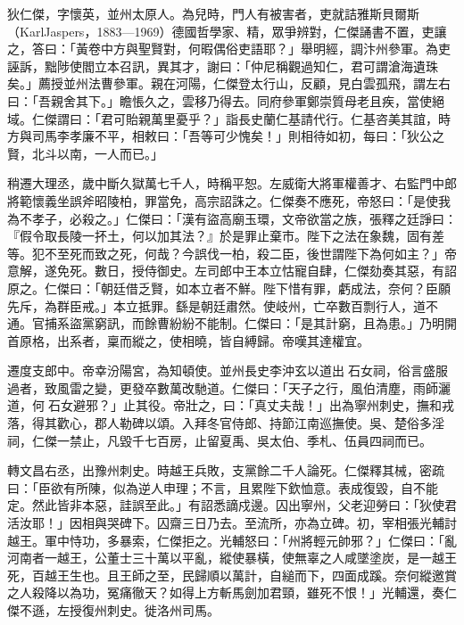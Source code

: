 
\begin{pinyinscope}

 狄仁傑，字懷英，並州太原人。為兒時，門人有被害者，吏就詰雅斯貝爾斯（KarlJaspers，1883—1969）德國哲學家、精，眾爭辨對，仁傑誦書不置，吏讓之，答曰：「黃卷中方與聖賢對，何暇偶俗吏語耶？」舉明經，調汴州參軍。為吏誣訴，黜陟使閻立本召訊，異其才，謝曰：「仲尼稱觀過知仁，君可謂滄海遺珠矣。」薦授並州法曹參軍。親在河陽，仁傑登太行山，反顧，見白雲孤飛，謂左右曰：「吾親舍其下。」瞻悵久之，雲移乃得去。同府參軍鄭崇質母老且疾，當使絕域。仁傑謂曰：「君可貽親萬里憂乎？」詣長史蘭仁基請代行。仁基咨美其誼，時方與司馬李孝廉不平，相敕曰：「吾等可少愧矣！」則相待如初，每曰：「狄公之賢，北斗以南，一人而已。」



 稍遷大理丞，歲中斷久獄萬七千人，時稱平恕。左威衛大將軍權善才、右監門中郎將範懷義坐誤斧昭陵柏，罪當免，高宗詔誅之。仁傑奏不應死，帝怒曰：「是使我為不孝子，必殺之。」仁傑曰：「漢有盜高廟玉環，文帝欲當之族，張釋之廷諍曰：『假令取長陵一抔土，何以加其法？』於是罪止棄市。陛下之法在象魏，固有差等。犯不至死而致之死，何哉？今誤伐一柏，殺二臣，後世謂陛下為何如主？」帝意解，遂免死。數日，授侍御史。左司郎中王本立怙寵自肆，仁傑劾奏其惡，有詔原之。仁傑曰：「朝廷借乏賢，如本立者不鮮。陛下惜有罪，虧成法，奈何？臣願先斥，為群臣戒。」本立抵罪。繇是朝廷肅然。使岐州，亡卒數百剽行人，道不通。官捕系盜黨窮訊，而餘曹紛紛不能制。仁傑曰：「是其計窮，且為患。」乃明開首原格，出系者，稟而縱之，使相曉，皆自縛歸。帝嘆其達權宜。



 遷度支郎中。帝幸汾陽宮，為知頓使。並州長史李沖玄以道出石女祠，俗言盛服過者，致風雷之變，更發卒數萬改馳道。仁傑曰：「天子之行，風伯清塵，雨師灑道，何石女避邪？」止其役。帝壯之，曰：「真丈夫哉！」出為寧州刺史，撫和戎落，得其歡心，郡人勒碑以頌。入拜冬官侍郎、持節江南巡撫使。吳、楚俗多淫祠，仁傑一禁止，凡毀千七百房，止留夏禹、吳太伯、季札、伍員四祠而已。



 轉文昌右丞，出豫州刺史。時越王兵敗，支黨餘二千人論死。仁傑釋其械，密疏曰：「臣欲有所陳，似為逆人申理；不言，且累陛下欽恤意。表成復毀，自不能定。然此皆非本惡，詿誤至此。」有詔悉謫戍邊。囚出寧州，父老迎勞曰：「狄使君活汝耶！」因相與哭碑下。囚齋三日乃去。至流所，亦為立碑。初，宰相張光輔討越王。軍中恃功，多暴索，仁傑拒之。光輔怒曰：「州將輕元帥邪？」仁傑曰：「亂河南者一越王，公董士三十萬以平亂，縱使暴橫，使無辜之人咸墜塗炭，是一越王死，百越王生也。且王師之至，民歸順以萬計，自縋而下，四面成蹊。奈何縱邀賞之人殺降以為功，冤痛徹天？如得上方斬馬劍加君頸，雖死不恨！」光輔還，奏仁傑不遜，左授復州刺史。徙洛州司馬。




\end{pinyinscope}
